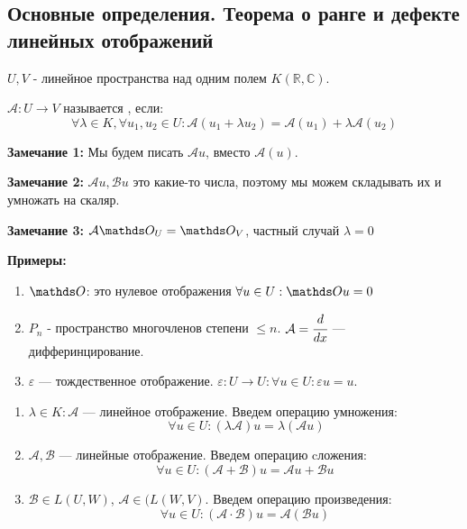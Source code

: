 \subsection{Основные определения. Теорема о ранге и дефекте линейных отображений}

 $U,V$ - линейное пространства над одним полем $K(\mathbb{R}, \mathbb{C})$.

$\mathcal{A}: U\rightarrow V$ называется , если: 
$$\forall \lambda \in K,\forall u_1, u_2 \in U: \mathcal{A}(u_1 + \lambda u_2) = \mathcal{A} (u_1) + \lambda\mathcal{A}(u_2)$$

\textbf{Замечание 1:} Мы будем писать $\mathcal{A} u$, вместо $\mathcal{A}(u)$.

\textbf{Замечание 2:} $\mathcal{A}u, \mathcal{B}u$ это какие-то числа, поэтому мы можем складывать их и умножать на скаляр.

\textbf{Замечание 3:} $\mathcal{A} \zero_U = \zero_V$, частный случай $\lambda = 0$

\textbf{Примеры:}
\begin{enumerate}
    \item $\zero$: это нулевое отображения $\forall u \in U: \zero u = 0$ 

    \item $P_n$ - пространство многочленов степени $\leq n$. $\mathcal{A}=\cfrac{d}{dx}$ --- дифферинцирование.

    \item $\varepsilon$ --- тождественное отображение. $\varepsilon: U\rightarrow U:\forall u\in U: \varepsilon u = u$.
\end{enumerate}


\begin{enumerate}
    \item $\lambda \in K: \mathcal{A}$ --- линейное отображение. Введем операцию умножения:
$$\ \forall u \in U: (\lambda\mathcal{A}) u = \lambda(\mathcal{A} u)$$
    \item $\mathcal{A}, \mathcal{B}$ --- линейные отображение. Введем операцию cложения: 
    $$ \forall u \in U:(\mathcal{A} + \mathcal{B}) u = \mathcal{A}u + \mathcal{B}u $$
    

    \item  $\mathcal{B}\in L(U,W)$, $\mathcal{A} \in (L(W,V)$. Введем операцию произведения:
    $$\forall u \in U:(\mathcal{A} \cdot \mathcal{B}) u = \mathcal{A}(\mathcal{B}u)$$
    
\end{enumerate}


